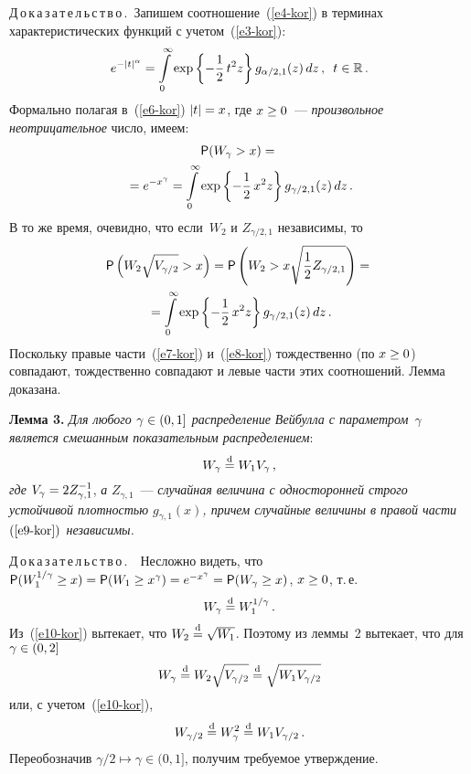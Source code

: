 \begin{multicols}{2}
\noindent
Д\,о\,к\,а\,з\,а\,т\,е\,л\,ь\,с\,т\,в\,о\,.\ Запишем соотношение~(\ref{e4-kor}) в терминах
характеристических функций с учетом~(\ref{e3-kor}):
\begin{equation}
e^{-|t|^{\alpha}}=\int\limits_{0}^{\infty}\exp
\left\{-\displaystyle\frac{\displaystyle 1\mathstrut}{\displaystyle 2\mathstrut}\,t^2z\right\}g_{\alpha/2,1}(z)\,dz\,,
\enskip t\in\mathbb{R}\,.\label{e6-kor}
\end{equation}
Формально полагая в~(\ref{e6-kor}) $|t|\hm=x$, где $x\hm\ge0$~--- {\it произвольное
неотрицательное} число, имеем:
\begin{multline}
{\sf
P}(W_{\gamma}>x)={}\\
{}=e^{-x^{\gamma}}=\int\limits_{0}^{\infty}
\exp\left\{-\displaystyle\frac{\displaystyle 1\mathstrut}{\displaystyle 2\mathstrut}\,x^2z\right\}g_{\gamma/2,1}(z)\,dz\,.\label{e7-kor}
\end{multline}
В то же время, очевидно, что если~$W_2$ и $Z_{\gamma/2,1}$
независимы, то
\begin{multline}
{\sf P}\left(W_2 \sqrt{V_{\gamma/2}}>x\right)=
{\sf P}\left(W_2>x\sqrt{\displaystyle\frac{\displaystyle 1\mathstrut}{\displaystyle 2\mathstrut}Z_{\gamma/2,1}}\right)={}\\
{}=
\int\limits_{0}^{\infty}\exp\left\{-\displaystyle\frac{\displaystyle 1\mathstrut}{\displaystyle 2\mathstrut}\,x^2z\right\}g_{\gamma/2,1}(z)\,dz\,.
\label{e8-kor}
\end{multline}
Поскольку правые части~(\ref{e7-kor}) и~(\ref{e8-kor}) тождественно (по $x\hm\ge0$)
совпадают, тождественно совпадают и левые части этих соотношений.
Лемма доказана.

\smallskip

\noindent
\textbf{Лемма 3.} \textit{Для любого $\gamma\hm\in(0,1]$ распределение
Вейбулла с параметром~$\gamma$ является смешанным показательным
распределением}:
\begin{equation}
W_{\gamma}\stackrel{\mathrm{d}}{=} W_1 V_{\gamma}\,,\label{e9-kor}
\end{equation}
\textit{где} $V_{\gamma}\hm=2Z_{\gamma,1}^{-1}$, \textit{а}
$Z_{\gamma,1}$~---
\textit{случайная величина с односторонней строго устойчивой плотностью
$g_{\gamma,1}(x)$, причем случайные величины в правой час\-ти~$(\ref{e9-kor})$
независимы.}

\smallskip

\noindent
Д\,о\,к\,а\,з\,а\,т\,е\,л\,ь\,с\,т\,в\,о\,.\ \ Несложно видеть, что
${\sf P}(W_1^{1/\gamma}\hm\ge x)\hm={\sf P}(W_1\hm\ge
x^{\gamma})\hm=e^{-x^{\gamma}}\hm={\sf P}(W_{\gamma}\hm\ge x)$, $x\hm\ge 0$, т.\,е.\
\begin{equation}
W_{\gamma}\stackrel{\mathrm{d}}{=} W_1^{1/\gamma}\,.\label{e10-kor}
\end{equation}
Из~(\ref{e10-kor}) вытекает, что $W_2\stackrel{\mathrm{d}}{=}\sqrt{W_1}$. Поэтому из леммы~2
вытекает, что для $\gamma\hm\in(0,2]$
$$
W_{\gamma}\stackrel{\mathrm{d}}{=} W_2 \sqrt{V_{\gamma/2}}\stackrel{\mathrm{d}}{=}\sqrt{W_1 V_{\gamma/2}}
$$
или, с учетом~(\ref{e10-kor}),
$$
W_{\gamma/2}\stackrel{\mathrm{d}}{=} W_{\gamma}^2\stackrel{\mathrm{d}}{=} W_1 V_{\gamma/2}\,.
$$
Переобозначив $\gamma/2\longmapsto \gamma\in(0,1]$, получим
тре\-бу\-емое утверждение.


\end{multicols}
